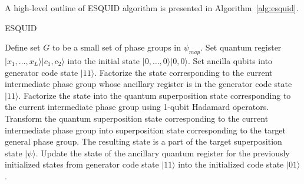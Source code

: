 A high-level outline of ESQUID algorithm is presented in Algorithm~\ref{alg:esquid}.
\begin{algorithm}
	\caption{ESQUID}
	\label{alg:esquid}
	\begin{algorithmic}[1]
		\STATE Define set $G$ to be a small set of phase groups in $\psi_{map}$.
		\STATE Set quantum register $\vert x_1,\ldots,x_{L} \rangle \vert c_1,c_2 \rangle$ into the initial state $\vert 0,\ldots,0 \rangle \vert 0,0 \rangle$.
		\STATE Set ancilla qubits into generator code state $\vert 11 \rangle$.
			\STATE Factorize the state corresponding to the current intermediate phase group whose ancillary register is in the generator code state $\vert 11 \rangle$.
			\STATE Factorize the state into the quantum superposition state corresponding to the current intermediate phase group using 1-qubit Hadamard operators.
			\STATE Transform the quantum superposition state corresponding to the current intermediate phase group into superposition state corresponding to the target general phase group. The resulting state is a part of the target superposition state $\vert \psi \rangle$.
			\STATE Update the state of the ancillary quantum register for the previously initialized states from generator code state $\vert 11 \rangle$ into the initialized code state $\vert 01 \rangle$.
		\ENDFOR
	\end{algorithmic}
\end{algorithm}



